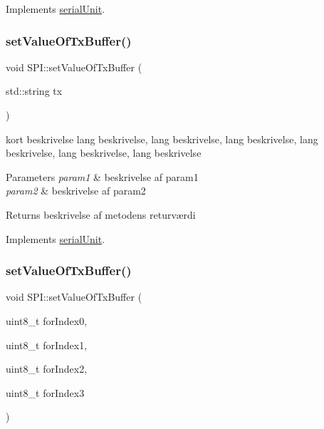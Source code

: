 Implements \hyperlink{classserialUnit_a5d5573f6d367d8e191df6b8044a81a62}{serial\+Unit}.

\mbox{\label{classSPI_ad770b7e8e8ae678a2c3c5e2d2be6887a}} 
\subsubsection{\texorpdfstring{set\+Value\+Of\+Tx\+Buffer()}{setValueOfTxBuffer()}\hspace{0.1cm}{\footnotesize\ttfamily [1/2]}}
{\footnotesize\ttfamily void S\+P\+I\+::set\+Value\+Of\+Tx\+Buffer (\begin{DoxyParamCaption}\item[{std\+::string}]{tx }\end{DoxyParamCaption})\hspace{0.3cm}{\ttfamily [virtual]}}



kort beskrivelse lang beskrivelse, lang beskrivelse, lang beskrivelse, lang beskrivelse, lang beskrivelse, lang beskrivelse 


\begin{DoxyParams}{Parameters}
{\em param1} & beskrivelse af param1 \\
\hline
{\em param2} & beskrivelse af param2 \\
\hline
\end{DoxyParams}
\begin{DoxyReturn}{Returns}
beskrivelse af metodens returværdi 
\end{DoxyReturn}


Implements \hyperlink{classserialUnit_a759db776a18c097ce85652d41d46b943}{serial\+Unit}.

\mbox{\label{classSPI_ad581e7b40a17f41f8d6db8dec97c9c4b}} 
\subsubsection{\texorpdfstring{set\+Value\+Of\+Tx\+Buffer()}{setValueOfTxBuffer()}\hspace{0.1cm}{\footnotesize\ttfamily [2/2]}}
{\footnotesize\ttfamily void S\+P\+I\+::set\+Value\+Of\+Tx\+Buffer (\begin{DoxyParamCaption}\item[{uint8\+\_\+t}]{for\+Index0,  }\item[{uint8\+\_\+t}]{for\+Index1,  }\item[{uint8\+\_\+t}]{for\+Index2,  }\item[{uint8\+\_\+t}]{for\+Index3 }\end{DoxyParamCaption})\hspace{0.3cm}{\ttfamily [virtual]}}



